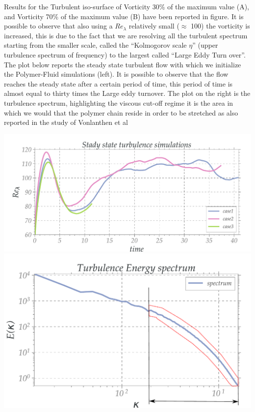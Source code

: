 \documentclass[a0paper,portrait]{baposter}
\begin{document}
\begin{poster}
{\footnotesize{

Results for the Turbulent iso-surface of Vorticity 30\% of the maximum value (A), and Vorticity 70\% of the maximum value (B) have been reported in figure. It is possible to observe that also using a $Re_\lambda$ relatively small ($\approx$ 100) the vorticity is increased, this is due to the fact that we are resolving all the turbulent spectrum starting from the smaller scale, called the ``Kolmogorov scale $\eta$'' (upper turbulence spectrum of frequency) to the largest called ``Large Eddy Turn over''.
The plot below reports the steady state turbulent flow with which we initialize the Polymer-Fluid simulations (left). It is possible to observe that the flow reaches the steady state after a certain period of time, this period of time is almost equal to thirty times the Large eddy turnover. The plot on the right is the turbulence spectrum, highlighting the viscous cut-off regime it is the area in which we would that the polymer chain reside in order to be stretched as also reported in the study of Vonlanthen et al~\cite{tizia} 


    \hspace{-18pt}
        \includegraphics[width=0.6\linewidth]{turbulence}
        \includegraphics[width=0.45\linewidth]{spectra2}
    
    \vspace{14pt}

}}
\end{poster}
\end{document}
